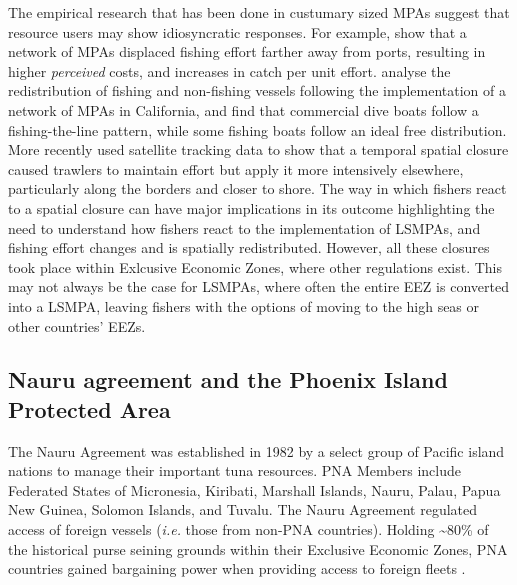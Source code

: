 \documentclass[11pt,]{article}
\begin{document}
The empirical research that has been done in custumary sized MPAs
suggest that resource users may show idiosyncratic responses. For
example, \citet{stevenson_2013} show that a network of MPAs displaced
fishing effort farther away from ports, resulting in higher
\emph{perceived} costs, and increases in catch per unit effort.
\citet{cabral_2017} analyse the redistribution of fishing and
non-fishing vessels following the implementation of a network of MPAs in
California, and find that commercial dive boats follow a
fishing-the-line pattern, while some fishing boats follow an ideal free
distribution. More recently \citet{elahi_2018} used satellite tracking
data to show that a temporal spatial closure caused trawlers to maintain
effort but apply it more intensively elsewhere, particularly along the
borders and closer to shore. The way in which fishers react to a spatial
closure can have major implications in its outcome
\citep{smith_2003,hilborn_2006} highlighting the need to understand how
fishers react to the implementation of LSMPAs, and fishing effort
changes and is spatially redistributed. However, all these closures took
place within Exlcusive Economic Zones, where other regulations exist.
This may not always be the case for LSMPAs, where often the entire EEZ
is converted into a LSMPA, leaving fishers with the options of moving to
the high seas or other countries' EEZs.

\hypertarget{nauru-agreement-and-the-phoenix-island-protected-area}{%
\subsection{Nauru agreement and the Phoenix Island Protected
Area}\label{nauru-agreement-and-the-phoenix-island-protected-area}}

The Nauru Agreement was established in 1982 by a select group of Pacific
island nations to manage their important tuna resources. PNA Members
include Federated States of Micronesia, Kiribati, Marshall Islands,
Nauru, Palau, Papua New Guinea, Solomon Islands, and Tuvalu. The Nauru
Agreement regulated access of foreign vessels (\emph{i.e.} those from
non-PNA countries). Holding \textasciitilde{}80\% of the historical
purse seining grounds within their Exclusive Economic Zones, PNA
countries gained bargaining power when providing access to foreign
fleets \citep{havice_2010}.
\end{document}
